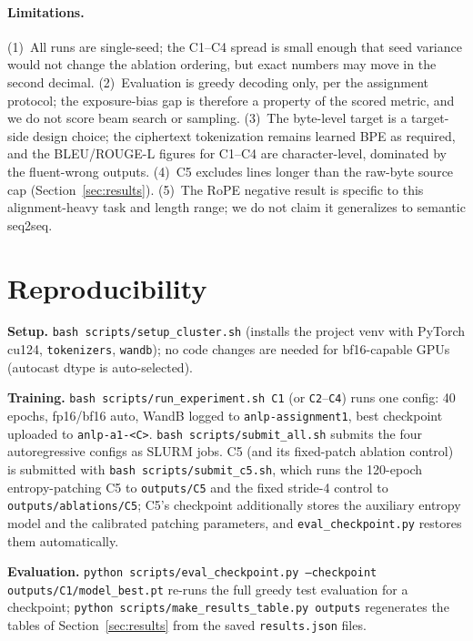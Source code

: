 \documentclass[11pt]{article}
\begin{document}
\paragraph{Limitations.}
(1)~All runs are single-seed; the C1--C4 spread is small enough that seed
variance would not change the ablation ordering, but exact numbers may move in
the second decimal. (2)~Evaluation is greedy decoding only, per the assignment
protocol; the exposure-bias gap is therefore a property of the scored metric, and
we do not score beam search or sampling. (3)~The byte-level target is a
target-side design choice; the ciphertext tokenization remains learned BPE as
required, and the BLEU/ROUGE-L figures for C1--C4 are character-level,
dominated by the fluent-wrong outputs. (4)~C5 excludes lines longer than the
raw-byte source cap (Section~\ref{sec:results}). (5)~The RoPE negative result is
specific to this alignment-heavy task and length range; we do not claim it
generalizes to semantic seq2seq.

\section{Reproducibility}
\label{sec:repro}
\textbf{Setup.} \texttt{bash scripts/setup\_cluster.sh} (installs the project
venv with PyTorch cu124, \texttt{tokenizers}, \texttt{wandb}); no code changes
are needed for bf16-capable GPUs (autocast dtype is auto-selected).

\textbf{Training.} \texttt{bash scripts/run\_experiment.sh C1} (or
\texttt{C2}--\texttt{C4}) runs one config: 40 epochs, fp16/bf16 auto, WandB
logged to \texttt{anlp-assignment1}, best checkpoint uploaded to
\texttt{anlp-a1-<C>}. \texttt{bash scripts/submit\_all.sh} submits the four
autoregressive configs as SLURM jobs. C5 (and its fixed-patch ablation control)
is submitted with \texttt{bash scripts/submit\_c5.sh}, which runs the 120-epoch
entropy-patching C5 to \texttt{outputs/C5} and the fixed stride-4 control to
\texttt{outputs/ablations/C5}; C5's checkpoint additionally stores the auxiliary
entropy model and the calibrated patching parameters, and
\texttt{eval\_checkpoint.py} restores them automatically.

\textbf{Evaluation.} \texttt{python scripts/eval\_checkpoint.py --checkpoint
outputs/C1/model\_best.pt} re-runs the full greedy test evaluation for a
checkpoint; \texttt{python scripts/make\_results\_table.py outputs} regenerates
the tables of Section~\ref{sec:results} from the saved
\texttt{results.json} files.
\end{document}
